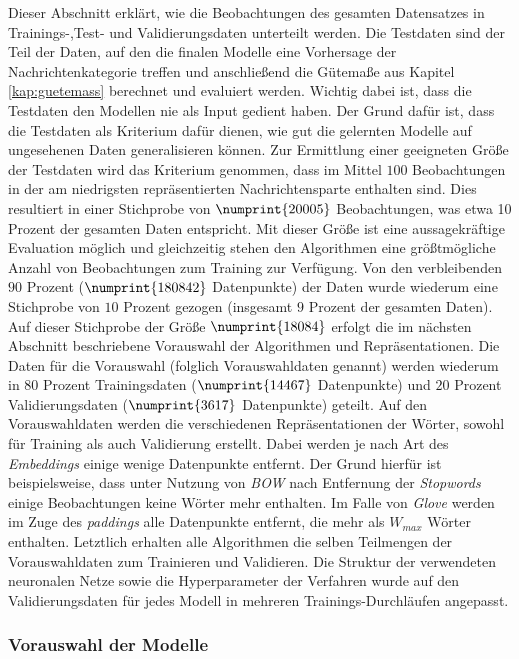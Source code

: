 \documentclass[a4paper,11pt]{article}
\begin{document}
Dieser Abschnitt erklärt, wie die  Beobachtungen des gesamten Datensatzes in \\
Trainings-,Test- und Validierungsdaten unterteilt werden.
Die Testdaten sind der Teil der Daten, auf den die finalen Modelle eine Vorhersage der Nachrichtenkategorie treffen und anschließend die Gütemaße aus Kapitel \ref{kap:guetemass} berechnet und evaluiert werden. Wichtig dabei ist, dass die Testdaten den Modellen nie als Input gedient haben. Der Grund dafür ist, dass die Testdaten als Kriterium dafür dienen, wie gut die gelernten Modelle auf ungesehenen Daten generalisieren können. Zur Ermittlung einer geeigneten Größe der Testdaten wird das Kriterium genommen, dass im Mittel $100$ Beobachtungen in der am niedrigsten repräsentierten Nachrichtensparte enthalten sind. Dies resultiert in einer Stichprobe von $\numprint{20005}$ Beobachtungen, was etwa 10 Prozent der gesamten Daten entspricht. 
Mit dieser Größe ist eine aussagekräftige Evaluation möglich und gleichzeitig stehen den Algorithmen eine größtmögliche Anzahl von Beobachtungen zum Training zur Verfügung. Von den verbleibenden $90$ Prozent ($\numprint{180842}$ Datenpunkte) der Daten wurde wiederum eine Stichprobe von $10$ Prozent gezogen (insgesamt $9$ Prozent der gesamten Daten). Auf dieser Stichprobe der Größe $\numprint{18084}$ erfolgt die im nächsten Abschnitt beschriebene Vorauswahl der Algorithmen und Repräsentationen. Die Daten für die Vorauswahl (folglich Vorauswahldaten genannt) werden wiederum in $80$ Prozent Trainingsdaten ($\numprint{14467}$ Datenpunkte) und $20$ Prozent  Validierungsdaten ($\numprint{3617}$ Datenpunkte) geteilt. Auf den Vorauswahldaten werden die verschiedenen Repräsentationen der Wörter, sowohl für Training als auch Validierung erstellt. Dabei werden je nach Art des \textit{Embeddings} einige wenige Datenpunkte entfernt. Der Grund hierfür ist beispielsweise, dass  unter Nutzung von \textit{BOW} nach Entfernung der \textit{Stopwords} einige Beobachtungen keine Wörter mehr enthalten. Im Falle von \textit{Glove} werden im Zuge des \textit{paddings} alle Datenpunkte entfernt, die mehr als $W_{max}$ Wörter enthalten.
Letztlich erhalten alle Algorithmen die selben Teilmengen der Vorauswahldaten zum Trainieren und Validieren. Die Struktur der verwendeten neuronalen Netze sowie die Hyperparameter der Verfahren wurde auf den Validierungsdaten für jedes Modell in mehreren Trainings-Durchläufen angepasst.

\subsubsection{Vorauswahl der Modelle}\label{kap:preselection}
\end{document}
